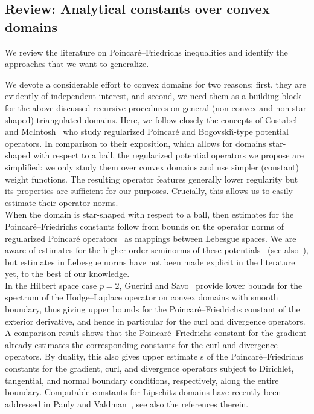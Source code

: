 \documentclass[10pt,a4paper]{article}
\newcommand\cye[1]{%
\protect\leavevmode
\begingroup
    \color{blue}%
    #1%
\endgroup
}
\begin{document}
\subsection{Review: Analytical constants over convex domains}


We review the literature on Poincar\'e--Friedrichs inequalities and identify the approaches that we want to generalize. 


\cye{We devote a considerable effort to convex domains for two reasons: first, they are evidently of independent interest, and second, we need them as a building block for the above-discussed recursive procedures on general (non-convex and non-star-shaped) triangulated domains. Here,} we follow closely the \cye{concepts of} Costabel and McIntosh~\cite{costabel2010bogovskiui} who study regularized Poincar\'e and Bogovski\u{\i}-type potential operators. In comparison to their exposition, \cye{which allows for} domains star-shaped with respect to a ball, the regularized potential operators we propose are simplified: we only study them over convex domains and use simpler (constant) weight functions. 
The resulting operator features generally lower regularity \cye{but} its properties are sufficient for our purposes. \cye{Crucially, this allows us to} easily estimate their operator norms. 
\\

When the domain is star-shaped with respect to a ball, then estimates for the Poincar\'e--Friedrichs constants 
follow from bounds on the operator norms of regularized Poincar\'e operators~\cite{costabel2010bogovskiui}
as mappings between Lebesgue spaces. 
We are aware of estimates for the higher-order seminorms of these potentials~\cite{guzman2021estimation} (see also~\cite{gallistl2023computational}),
but estimates in Lebesgue norms have not been made explicit in the literature yet, to the best of our knowledge.
\\

In the Hilbert space case $p=2$, Guerini and Savo~\cite{guerini2004eigenvalue} provide lower bounds for the spectrum of the Hodge--Laplace operator on convex domains with smooth boundary, thus giving upper bounds for the Poincar\'e--Friedrichs constant of the exterior derivative, and hence \cye{in particular} for the curl and divergence operators.
\cye{A comparison result} shows that the Poincar\'e--Friedrichs constant for the gradient already estimates the corresponding constants for the curl and divergence operators. By duality, this also \cye{gives} upper estimate\cye{s} of the Poincar\'e--Friedrichs constants for the gradient, curl, and divergence \cye{operators} subject to Dirichlet, tangential, and normal boundary conditions, respectively, along the entire boundary. 
\cye{Computable constants for Lipschitz domains have recently been addressed in Pauly and Valdman~\cite{Paul_Vald_PF_grad_curl_div_20}, see also the references therein.}
\end{document}
